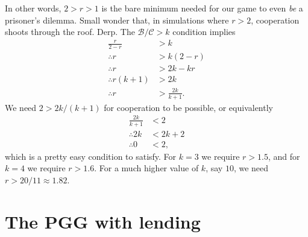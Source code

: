 \documentclass[13pt]{amsart}
\begin{document}
In other words, $2 > r > 1$ is the bare minimum needed for our game to even \emph{be} a prisoner's dilemma.
Small wonder that, in simulations where $r > 2$, cooperation shoots through the roof.
Derp.
The $\mathcal{B}/\mathcal{C} > k$ condition implies
\begin{equation}
    \begin{split}
        \frac{r}{2-r} & > k \\
        \therefore r & > k(2-r) \\
        \therefore r & > 2k - kr \\
        \therefore r(k+1) & > 2k \\
        \therefore r & > \frac{2k}{k+1}.
    \end{split}
    \label{eq:base_case}
\end{equation}
We need $2 > 2k/(k+1)$ for cooperation to be possible, or equivalently
\begin{equation}
    \begin{split}
        \frac{2k}{k+1} & < 2 \\
        \therefore 2k & < 2k + 2 \\
        \therefore 0 & < 2,
    \end{split}
\end{equation}
which is a pretty easy condition to satisfy.
For $k = 3$ we require $r > 1.5$, and for $k = 4$ we require $r > 1.6$.
For a much higher value of $k$, say $10$, we need $r > 20/11 \approx 1.82$.

\section{The PGG with lending}
\end{document}
